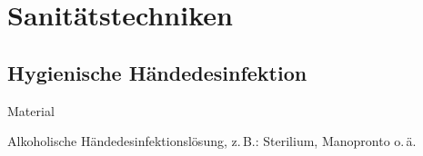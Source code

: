 \documentclass[
ngerman,
paper=a4,
asymmetric,
fontsize=8pt,
draft=false,
numbers=noenddot,
bibtotocnumbered,
footnotes=multiple,
toc=flat,
]{scrbook}
\begin{document}
\normalfont

\begin{Literary}


\end{Literary}



\nocite{ZechaOpGehilfe1}

\chapter{Sanitätstechniken}

\clearpage

\section{Hygienische Händedesinfektion}
\label{topic:hygienische-haendedesinfektion}




\Text
{Material}
{\begin{compactitem}
    \item Alkoholische Händedesinfektionslösung, z.\,B.:
    Sterilium\texttrademark{}, Manopronto\texttrademark{}
    o.\,ä.
\end{compactitem}}
{}
{}
{}
{}



\end{document}
